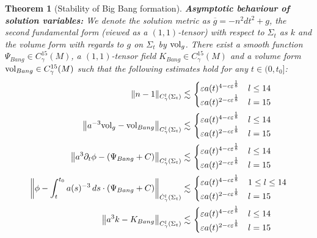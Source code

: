 \documentclass[11pt,leqno,textwidth=10cm]{amsart}
\numberwithin{equation}{section}
\theoremstyle{definition}
\theoremstyle{plain}
\newtheorem{theorem}[definition]{Theorem}
\newcommand{\1}{\mathbbm{1}}
\newcommand{\g}{\overline{g}}
\newcommand{\vol}[1]{{\text{\normalfont{vol}}}_{#1}}
\renewcommand{\epsilon}{\varepsilon}
\newcommand{\del}{\partial}
\begin{document}
\begin{theorem}[Stability of Big Bang formation]
\textbf{Asymptotic behaviour of solution variables:} We denote the solution metric as $\g=-n^2dt^2+g$, the second fundamental form (viewed as a $(1,1)$-tensor) with respect to $\Sigma_t$ as $k$ and the volume form with regards to $g$ on $\Sigma_t$ by $\vol{g}$. There exist a smooth function $\Psi_{Bang}\in C_\gamma^{15}(M)$, a $(1,1)$-tensor field $K_{Bang}\in C^{15}_\gamma(M)$ and a volume form $\vol{Bang}\in C^{15}_\gamma(M)$ such that the following estimates hold for any $t\in(0,t_0]$:%
\begin{subequations}
\begin{align}
\label{eq:asymp-lapse}\|n-1\|_{C^l_\gamma(\Sigma_t)}\lesssim&\,\begin{cases} 
\epsilon a(t)^{4-c\epsilon^\frac18} & l\leq 14\\
\epsilon a(t)^{2-c\epsilon^\frac18} & l=15
\end{cases}\\
\label{eq:asymp-vol}\left\|a^{-3}\vol{g}-\vol{Bang}\right\|_{C^{l}_\gamma(\Sigma_t)}\lesssim&\,\begin{cases} 
\epsilon a(t)^{4-c\epsilon^\frac18} & l\leq 14\\
\epsilon a(t)^{2-c\epsilon^\frac18} & l=15
\end{cases}\\
\label{eq:asymp-Psi}\left\|a^3\del_t\phi-(\Psi_{Bang}+C)\right\|_{C^{l}_\gamma(\Sigma_t)}\lesssim&\,\begin{cases} 
\epsilon a(t)^{4-c\epsilon^\frac18} & l\leq 14\\
\epsilon a(t)^{2-c\epsilon^\frac18} & l=15
\end{cases}\\
\label{eq:asymp-phi}\left\|\phi-\int_t^{t_0}a(s)^{-3}\,ds\cdot(\Psi_{Bang}+C)\right\|_{\dot{C}^l_\gamma(\Sigma_t)}\lesssim&\,\begin{cases}
\epsilon a(t)^{4-c\epsilon^\frac18} & 1\leq l\leq 14\\
\epsilon a(t)^{2-c\epsilon^\frac18} & l=15
\end{cases}\\
\label{eq:asymp-K}\left\|a^{3}k-K_{Bang}\right\|_{C^{l}_\gamma(\Sigma_t)}\lesssim&\,\begin{cases} 
\epsilon a(t)^{4-c\epsilon^\frac18} & l\leq 14\\
\epsilon a(t)^{2-c\epsilon^\frac18} & l=15\,
\end{cases}
\end{align}
\end{subequations}


\end{theorem}
\end{document}
